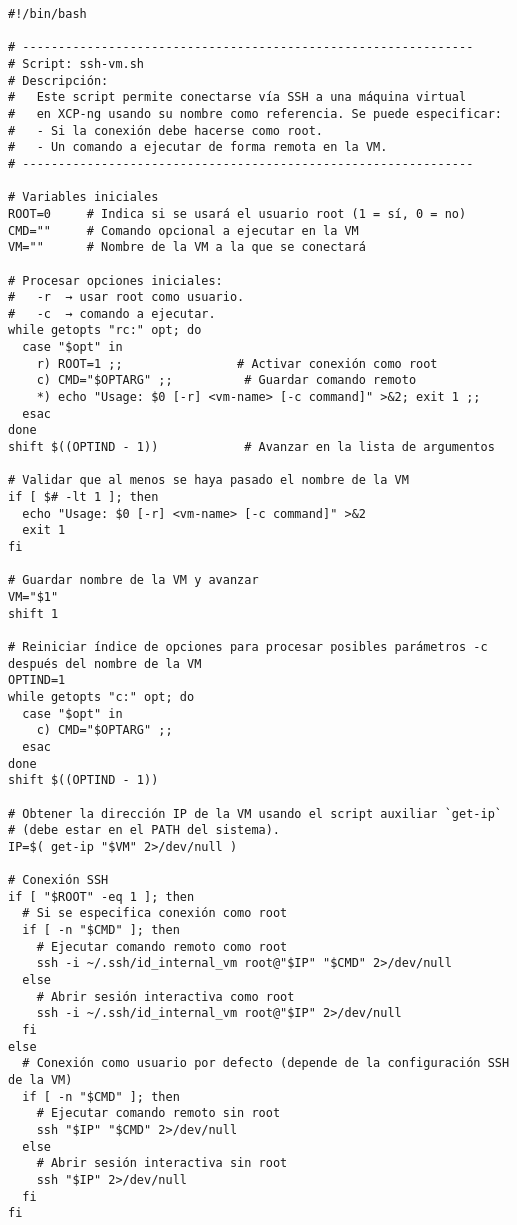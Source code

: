\begin{verbatim}
#!/bin/bash

# ---------------------------------------------------------------
# Script: ssh-vm.sh
# Descripción:
#   Este script permite conectarse vía SSH a una máquina virtual 
#   en XCP-ng usando su nombre como referencia. Se puede especificar:
#   - Si la conexión debe hacerse como root.
#   - Un comando a ejecutar de forma remota en la VM.
# ---------------------------------------------------------------

# Variables iniciales
ROOT=0     # Indica si se usará el usuario root (1 = sí, 0 = no)
CMD=""     # Comando opcional a ejecutar en la VM
VM=""      # Nombre de la VM a la que se conectará

# Procesar opciones iniciales: 
#   -r  → usar root como usuario.
#   -c  → comando a ejecutar.
while getopts "rc:" opt; do
  case "$opt" in
    r) ROOT=1 ;;                # Activar conexión como root
    c) CMD="$OPTARG" ;;          # Guardar comando remoto
    *) echo "Usage: $0 [-r] <vm-name> [-c command]" >&2; exit 1 ;;
  esac
done
shift $((OPTIND - 1))            # Avanzar en la lista de argumentos

# Validar que al menos se haya pasado el nombre de la VM
if [ $# -lt 1 ]; then
  echo "Usage: $0 [-r] <vm-name> [-c command]" >&2
  exit 1
fi

# Guardar nombre de la VM y avanzar
VM="$1"
shift 1

# Reiniciar índice de opciones para procesar posibles parámetros -c después del nombre de la VM
OPTIND=1
while getopts "c:" opt; do
  case "$opt" in
    c) CMD="$OPTARG" ;;
  esac
done
shift $((OPTIND - 1))

# Obtener la dirección IP de la VM usando el script auxiliar `get-ip`
# (debe estar en el PATH del sistema).
IP=$( get-ip "$VM" 2>/dev/null )

# Conexión SSH
if [ "$ROOT" -eq 1 ]; then
  # Si se especifica conexión como root
  if [ -n "$CMD" ]; then
    # Ejecutar comando remoto como root
    ssh -i ~/.ssh/id_internal_vm root@"$IP" "$CMD" 2>/dev/null
  else
    # Abrir sesión interactiva como root
    ssh -i ~/.ssh/id_internal_vm root@"$IP" 2>/dev/null
  fi
else
  # Conexión como usuario por defecto (depende de la configuración SSH de la VM)
  if [ -n "$CMD" ]; then
    # Ejecutar comando remoto sin root
    ssh "$IP" "$CMD" 2>/dev/null
  else
    # Abrir sesión interactiva sin root
    ssh "$IP" 2>/dev/null
  fi
fi
\end{verbatim}